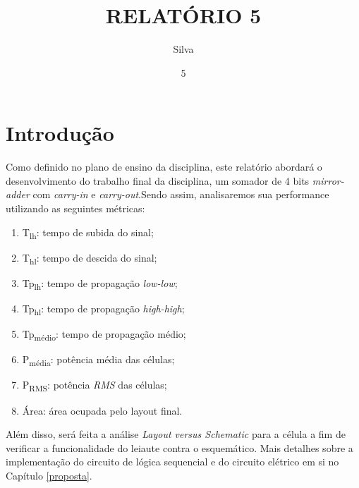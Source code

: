 \documentclass{iiufrgs}
\title{RELATÓRIO 5}
\author{Silva}{Henrique Corrêa Pereira da}
\date{5}{2018}
\begin{document}
\maketitle


\tableofcontents






%

\chapter{Introdução}\label{intro}

Como definido no plano de ensino da disciplina, este relatório abordará o desenvolvimento do trabalho final da disciplina, um somador de 4 bits \textit{mirror-adder} com \textit{carry-in} e \textit{carry-out}.Sendo assim, analisaremos sua performance utilizando as seguintes métricas:

\begin{enumerate}[leftmargin=3em, noitemsep] %
    \setlength{\itemindent}{1em}
    \item T\textsubscript{lh}: tempo de subida do sinal;
    \item T\textsubscript{hl}: tempo de descida do sinal;
    \item Tp\textsubscript{lh}: tempo de propagação \textit{low-low}; 
    \item Tp\textsubscript{hl}: tempo de propagação \textit{high-high}; 
    \item Tp\textsubscript{médio}: tempo de propagação médio; 
    \item P\textsubscript{média}: potência média das células; 
    \item P\textsubscript{RMS}: potência \textit{RMS} das células;
    \item Área: área ocupada pelo layout final.
\end{enumerate}

Além disso, será feita a análise \textit{Layout versus Schematic} para a célula a fim de  verificar a funcionalidade do leiaute contra o esquemático. Mais detalhes sobre a implementação do circuito de lógica sequencial e do circuito elétrico em si no Capítulo \ref{proposta}. \
\end{document}
